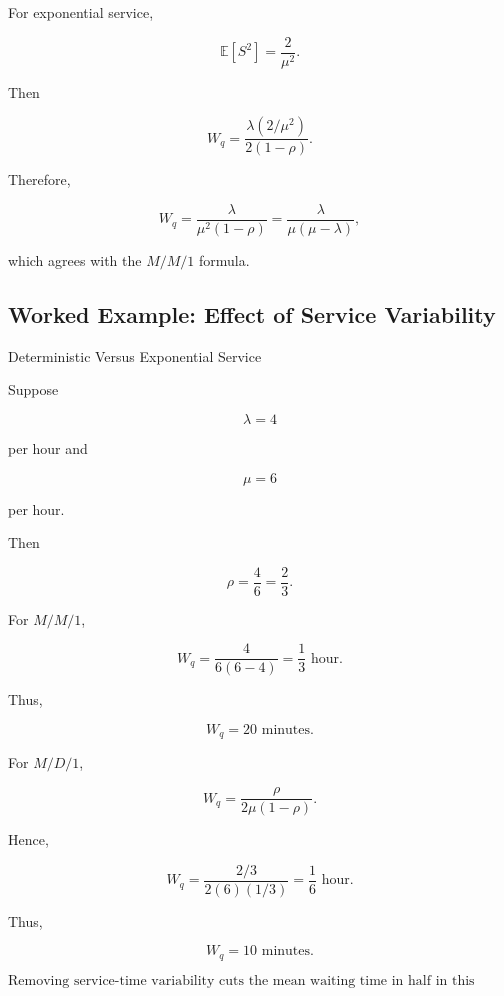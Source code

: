 For exponential service,

\[
\boxed{
\mathbb{E}[S^2]
=
\frac{2}{\mu^2}.
}
\]

Then

\[
W_q
=
\frac{
\lambda(2/\mu^2)
}{
2(1-\rho)
}.
\]

Therefore,

\[
\boxed{
W_q
=
\frac{
\lambda
}{
\mu^2(1-\rho)
}
=
\frac{
\lambda
}{
\mu(\mu-\lambda)
},
}
\]

which agrees with the \(M/M/1\) formula.

\subsection{Worked Example: Effect of Service Variability}
\label{subsec:worked-service-variability}

\begin{workedexamplebox}{Deterministic Versus Exponential Service}

Suppose

\[
\lambda=4
\]

per hour and

\[
\mu=6
\]

per hour.

Then

\[
\rho
=
\frac46
=
\frac23.
\]

For \(M/M/1\),

\[
W_q
=
\frac{
4
}{
6(6-4)
}
=
\frac13
\text{ hour}.
\]

Thus,

\[
W_q=20
\text{ minutes}.
\]

For \(M/D/1\),

\[
W_q
=
\frac{
\rho
}{
2\mu(1-\rho)
}.
\]

Hence,

\[
W_q
=
\frac{
2/3
}{
2(6)(1/3)
}
=
\frac16
\text{ hour}.
\]

Thus,

\[
W_q=10
\text{ minutes}.
\]

\begin{answerbox}
\[
\boxed{
\text{Removing service-time variability cuts the mean waiting time in half
in this example.}
}
\]
\end{answerbox}

\end{workedexamplebox}


